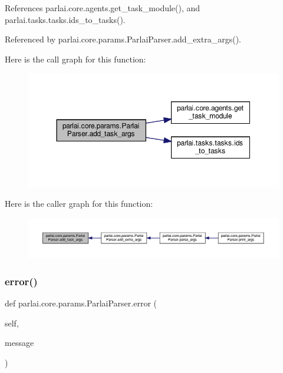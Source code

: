 References parlai.\+core.\+agents.\+get\+\_\+task\+\_\+module(), and parlai.\+tasks.\+tasks.\+ids\+\_\+to\+\_\+tasks().



Referenced by parlai.\+core.\+params.\+Parlai\+Parser.\+add\+\_\+extra\+\_\+args().

Here is the call graph for this function\+:
\nopagebreak
\begin{figure}[H]
\begin{center}
\leavevmode
\includegraphics[width=350pt]{classparlai_1_1core_1_1params_1_1ParlaiParser_a61ff766a70bd11365cbcbf71431ce527_cgraph}
\end{center}
\end{figure}
Here is the caller graph for this function\+:
\nopagebreak
\begin{figure}[H]
\begin{center}
\leavevmode
\includegraphics[width=350pt]{classparlai_1_1core_1_1params_1_1ParlaiParser_a61ff766a70bd11365cbcbf71431ce527_icgraph}
\end{center}
\end{figure}
\mbox{\label{classparlai_1_1core_1_1params_1_1ParlaiParser_a8d0cb15ecc35f82c94b5a19c2a6a9d12}} 
\subsubsection{\texorpdfstring{error()}{error()}}
{\footnotesize\ttfamily def parlai.\+core.\+params.\+Parlai\+Parser.\+error (\begin{DoxyParamCaption}\item[{}]{self,  }\item[{}]{message }\end{DoxyParamCaption})}

